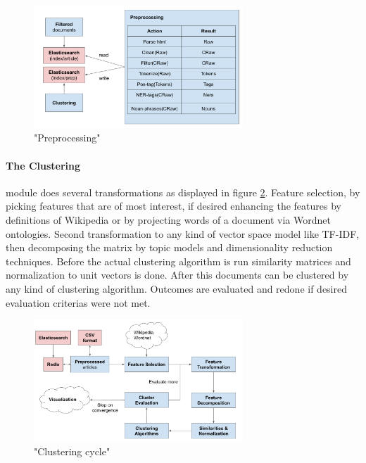     \begin{figure}[h!]
      \centering
        \includegraphics[width=0.7\textwidth]{preprocessing.png}
        \caption{"Preprocessing"}
        \label{preprocessing}
    \end{figure} 

  \paragraph{The Clustering} module does several transformations as displayed in figure \ref{clustering_cycle}. Feature selection, by picking features that are of most interest, if desired enhancing the features by definitions of Wikipedia or by projecting words of a document via Wordnet ontologies. Second transformation to any kind of vector space model like TF-IDF, then decomposing the matrix by topic models and dimensionality reduction techniques. Before the actual clustering algorithm is run similarity matrices and normalization to unit vectors is done. After this documents can be clustered by any kind of clustering algorithm. Outcomes are evaluated and redone if desired evaluation criterias were not met.

    \begin{figure}[h!]
      \centering
        \includegraphics[width=0.7\textwidth]{clustering_cycle.png}
        \caption{"Clustering cycle"}
        \label{clustering_cycle}
    \end{figure} 


